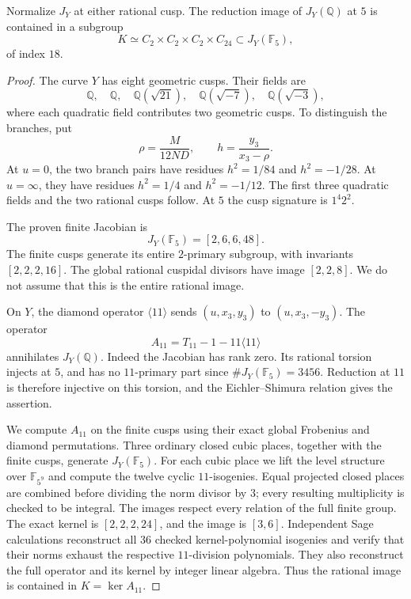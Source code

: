 \begin{lemma}\label{lem:decic242-quotient5-hecke}
Normalize $J_Y$ at either rational cusp. The reduction image
of $J_Y(\mathbb Q)$ at $5$ is contained in a subgroup
\[
 K\simeq C_2\times C_2\times C_2\times C_{24}
 \subset J_Y(\mathbb F_5),
\]
of index $18$.
\end{lemma}
\begin{proof}
The curve $Y$ has eight geometric cusps. Their fields are
\[
 \mathbb Q,\quad\mathbb Q,\quad\mathbb Q(\sqrt{21}),\quad
 \mathbb Q(\sqrt{-7}),\quad\mathbb Q(\sqrt{-3}),
\]
where each quadratic field contributes two geometric cusps.
To distinguish the branches, put
\[
 \rho=\frac{M}{12ND},\qquad h=\frac{y_3}{x_3-\rho}.
\]
At $u=0$, the two branch pairs have residues
$h^2=1/84$ and $h^2=-1/28$.
At $u=\infty$, they have residues
$h^2=1/4$ and $h^2=-1/12$.
The first three quadratic fields and the two rational cusps follow.
At $5$ the cusp signature is $1^4 2^2$.

The proven finite Jacobian is
\[
 J_Y(\mathbb F_5)=[2,6,6,48].
\]
The finite cusps generate its entire $2$-primary subgroup,
with invariants $[2,2,2,16]$.
The global rational cuspidal divisors have image $[2,2,8]$.
We do not assume that this is the entire rational image.

On $Y$, the diamond operator $\langle11\rangle$ sends
$(u,x_3,y_3)$ to $(u,x_3,-y_3)$.
The operator
\[
 A_{11}=T_{11}-1-11\langle11\rangle
\]
annihilates $J_Y(\mathbb Q)$.
Indeed the Jacobian has rank zero. Its rational torsion injects
at $5$, and has no $11$-primary part since
$\#J_Y(\mathbb F_5)=3456$. Reduction at $11$ is therefore
injective on this torsion, and the Eichler--Shimura relation gives
the assertion.

We compute $A_{11}$ on the finite cusps using their exact global
Frobenius and diamond permutations. Three ordinary closed cubic
places, together with the finite cusps, generate
$J_Y(\mathbb F_5)$. For each cubic place we lift the level
structure over $\mathbb F_{5^9}$ and compute the twelve cyclic
$11$-isogenies. Equal projected closed places are combined before
dividing the norm divisor by $3$; every resulting multiplicity
is checked to be integral.
The images respect every relation of the full finite group.
The exact kernel is $[2,2,2,24]$, and the image is $[3,6]$.
Independent Sage calculations reconstruct all $36$ checked
kernel-polynomial isogenies and verify that their norms exhaust
the respective $11$-division polynomials. They also reconstruct
the full operator and its kernel by integer linear algebra.
Thus the rational image is contained in $K=\ker A_{11}$.
\end{proof}

